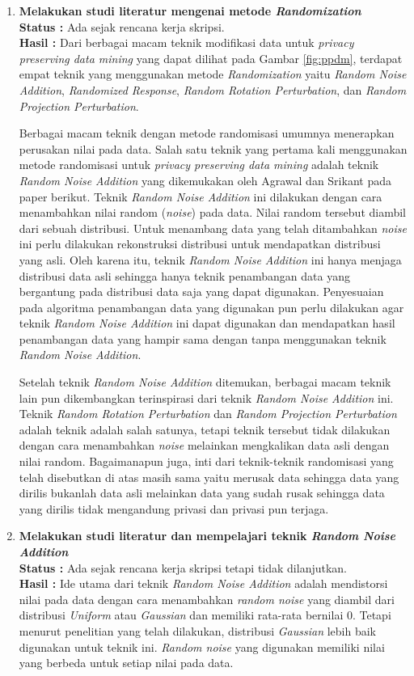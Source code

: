 \documentclass[a4paper,twoside]{article}
\begin{document}
\begin{enumerate}
		\item \textbf{Melakukan studi literatur mengenai metode \textit{Randomization}}\\
		{\bf Status :} Ada sejak rencana kerja skripsi.\\
		{\bf Hasil :} Dari berbagai macam teknik modifikasi data untuk \textit{privacy preserving data mining} yang dapat dilihat pada Gambar \ref{fig:ppdm}, terdapat empat teknik yang menggunakan metode \textit{Randomization} yaitu \textit{Random Noise Addition}, \textit{Randomized Response}, \textit{Random Rotation Perturbation}, dan \textit{Random Projection Perturbation}.

		Berbagai macam teknik dengan metode randomisasi umumnya menerapkan perusakan nilai pada data. Salah satu teknik yang pertama kali menggunakan metode randomisasi untuk \textit{privacy preserving data mining} adalah teknik \textit{Random Noise Addition} yang dikemukakan oleh Agrawal dan Srikant pada paper berikut. Teknik \textit{Random Noise Addition} ini dilakukan dengan cara menambahkan nilai random (\textit{noise}) pada data. Nilai random tersebut diambil dari sebuah distribusi. Untuk menambang data yang telah ditambahkan \textit{noise} ini perlu dilakukan rekonstruksi distribusi untuk mendapatkan distribusi yang asli. Oleh karena itu, teknik \textit{Random Noise Addition} ini hanya menjaga distribusi data asli sehingga hanya teknik penambangan data yang bergantung pada distribusi data saja yang dapat digunakan. Penyesuaian pada algoritma penambangan data yang digunakan pun perlu dilakukan agar teknik \textit{Random Noise Addition} ini dapat digunakan dan mendapatkan hasil penambangan data yang hampir sama dengan tanpa menggunakan teknik \textit{Random Noise Addition}.
		
		Setelah teknik \textit{Random Noise Addition} ditemukan, berbagai macam teknik lain pun dikembangkan terinspirasi dari teknik \textit{Random Noise Addition} ini. Teknik \textit{Random Rotation Perturbation} dan \textit{Random Projection Perturbation} adalah teknik adalah salah satunya, tetapi teknik tersebut tidak dilakukan dengan cara menambahkan \textit{noise} melainkan mengkalikan data asli dengan nilai random. Bagaimanapun juga, inti dari teknik-teknik randomisasi yang telah disebutkan di atas masih sama yaitu merusak data sehingga data yang dirilis bukanlah data asli melainkan data yang sudah rusak sehingga data yang dirilis tidak mengandung privasi dan privasi pun terjaga.
		
		\item \textbf{Melakukan studi literatur dan mempelajari teknik \textit{Random Noise Addition}}\\
		{\bf Status :} Ada sejak rencana kerja skripsi tetapi tidak dilanjutkan.\\
		{\bf Hasil :} Ide utama dari teknik \textit{Random Noise Addition} adalah mendistorsi nilai pada data dengan cara menambahkan \textit{random noise} yang diambil dari distribusi \textit{Uniform} atau \textit{Gaussian} dan memiliki rata-rata bernilai 0. Tetapi menurut penelitian yang telah dilakukan, distribusi \textit{Gaussian} lebih baik digunakan untuk teknik ini. \textit{Random noise} yang digunakan memiliki nilai yang berbeda untuk setiap nilai pada data.


\end{enumerate}
\end{document}
